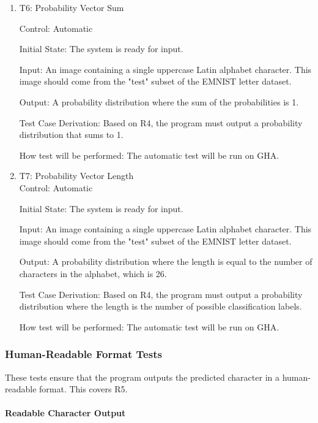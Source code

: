 \documentclass[12pt, titlepage]{article}
\begin{document}
\begin{enumerate}

\item{T6: Probability Vector Sum\\}

Control: Automatic

Initial State: The \progname{} system is ready for input.

Input: An image containing a single uppercase Latin alphabet character. This
image should come from the "test" subset of the EMNIST letter dataset.

Output: A probability distribution where the sum of the probabilities is 1.

Test Case Derivation: Based on R4, the program must output a probability distribution
that sums to 1.

How test will be performed: The automatic test will be run on GHA.

\item{T7: Probability Vector Length\\}
Control: Automatic

Initial State: The \progname{} system is ready for input.

Input: An image containing a single uppercase Latin alphabet character. This
image should come from the "test" subset of the EMNIST letter dataset.

Output: A probability distribution where the length is equal to the number of
characters in the alphabet, which is 26.

Test Case Derivation: Based on R4, the program must output a probability distribution
where the length is the number of possible classification labels.

How test will be performed: The automatic test will be run on GHA.

\end{enumerate}

\subsubsection{Human-Readable Format Tests}

These tests ensure that the program outputs the predicted character in a
human-readable format. This covers R5.

\paragraph{Readable Character Output}
\end{document}
